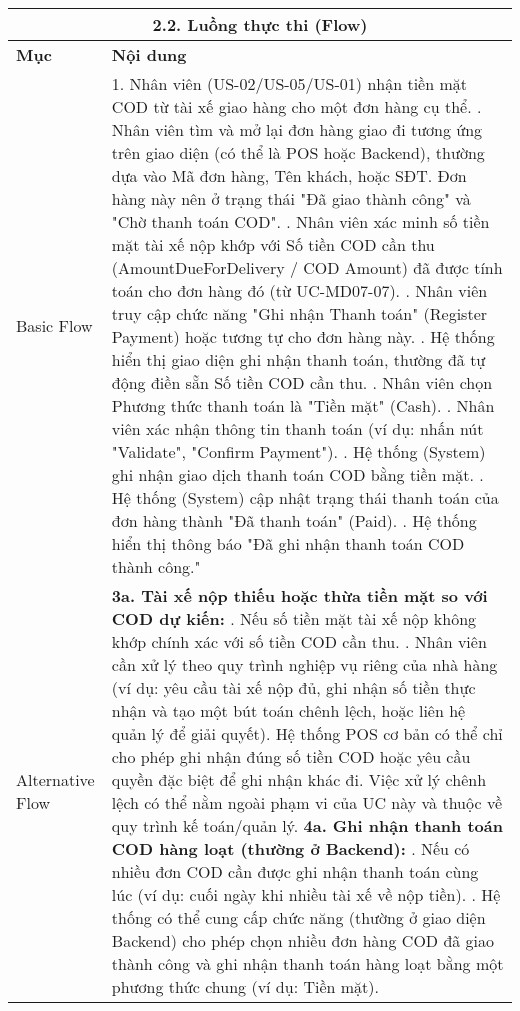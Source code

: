 \begin{longtable}{|m{4cm}|p{11cm}|}
\hline
\multicolumn{2}{|c|}{\textbf{2.2. Luồng thực thi (Flow)}} \\
\hline
\textbf{Mục} & \textbf{Nội dung} \\
\hline
Basic Flow & 1. Nhân viên (US-02/US-05/US-01) nhận tiền mặt COD từ tài xế giao hàng cho một đơn hàng cụ thể. \newline 2. Nhân viên tìm và mở lại đơn hàng giao đi tương ứng trên giao diện (có thể là POS hoặc Backend), thường dựa vào Mã đơn hàng, Tên khách, hoặc SĐT. Đơn hàng này nên ở trạng thái "Đã giao thành công" và "Chờ thanh toán COD". \newline 3. Nhân viên xác minh số tiền mặt tài xế nộp khớp với Số tiền COD cần thu (AmountDueForDelivery / COD Amount) đã được tính toán cho đơn hàng đó (từ UC-MD07-07). \newline 4. Nhân viên truy cập chức năng "Ghi nhận Thanh toán" (Register Payment) hoặc tương tự cho đơn hàng này. \newline 5. Hệ thống hiển thị giao diện ghi nhận thanh toán, thường đã tự động điền sẵn Số tiền COD cần thu. \newline 6. Nhân viên chọn Phương thức thanh toán là "Tiền mặt" (Cash). \newline 7. Nhân viên xác nhận thông tin thanh toán (ví dụ: nhấn nút "Validate", "Confirm Payment"). \newline 8. Hệ thống (System) ghi nhận giao dịch thanh toán COD bằng tiền mặt. \newline 9. Hệ thống (System) cập nhật trạng thái thanh toán của đơn hàng thành "Đã thanh toán" (Paid). \newline 10. Hệ thống hiển thị thông báo "Đã ghi nhận thanh toán COD thành công." \\
\hline
Alternative Flow & \textbf{3a. Tài xế nộp thiếu hoặc thừa tiền mặt so với COD dự kiến:} \newline    1. Nếu số tiền mặt tài xế nộp không khớp chính xác với số tiền COD cần thu. \newline    2. Nhân viên cần xử lý theo quy trình nghiệp vụ riêng của nhà hàng (ví dụ: yêu cầu tài xế nộp đủ, ghi nhận số tiền thực nhận và tạo một bút toán chênh lệch, hoặc liên hệ quản lý để giải quyết). Hệ thống POS cơ bản có thể chỉ cho phép ghi nhận đúng số tiền COD hoặc yêu cầu quyền đặc biệt để ghi nhận khác đi. Việc xử lý chênh lệch có thể nằm ngoài phạm vi của UC này và thuộc về quy trình kế toán/quản lý. \newline \textbf{4a. Ghi nhận thanh toán COD hàng loạt (thường ở Backend):} \newline    1. Nếu có nhiều đơn COD cần được ghi nhận thanh toán cùng lúc (ví dụ: cuối ngày khi nhiều tài xế về nộp tiền). \newline    2. Hệ thống có thể cung cấp chức năng (thường ở giao diện Backend) cho phép chọn nhiều đơn hàng COD đã giao thành công và ghi nhận thanh toán hàng loạt bằng một phương thức chung (ví dụ: Tiền mặt). \\

\end{longtable}
